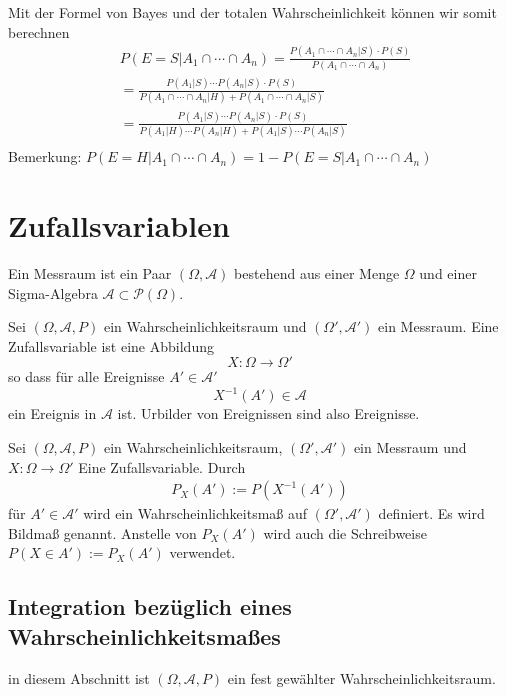 Mit der Formel von Bayes und der totalen Wahrscheinlichkeit  können wir somit berechnen
\begin{align*}
& P(E=S |  A_1 \cap \cdots \cap A_n) = \frac{P(A_1 \cap \cdots \cap A_n | S) \cdot P(S)}{P(A_1 \cap \cdots \cap A_n)} \\
&=  \frac{P(A_1 | S) \cdots P(A_n | S) \cdot P(S)}{P(A_1 \cap \cdots \cap A_n | H) + P(A_1 \cap \cdots \cap A_n | S)} \\
&=  \frac{P(A_1 | S) \cdots P(A_n | S) \cdot P(S)}{P(A_1 | H) \cdots P(A_n | H)  + P(A_1 | S) \cdots P(A_n | S) } \\
\end{align*}
Bemerkung: $P(E=H |  A_1 \cap \cdots \cap A_n) = 1- P(E=S |  A_1 \cap \cdots \cap A_n) $


\section{Zufallsvariablen}

\begin{Definition}
Ein Messraum ist ein Paar $(\Omega, \mathcal{A})$ bestehend aus einer Menge $\Omega$ und einer Sigma-Algebra $\mathcal{A} \subset \mathcal{P}(\Omega)$.
\end{Definition}



\begin{Definition}
Sei $(\Omega, \mathcal{A}, P)$ ein Wahrscheinlichkeitsraum und $(\Omega', \mathcal{A}')$ ein Messraum. Eine Zufallsvariable ist eine Abbildung
$$X : \Omega \to \Omega'$$ 
so dass für alle Ereignisse $A' \in  \mathcal{A}'$
$$ X^{-1} (A') \in \mathcal{A}$$
 ein Ereignis in $\mathcal{A}$ ist. Urbilder von Ereignissen sind also Ereignisse.
\end{Definition}

\begin{Definition}
Sei $(\Omega, \mathcal{A}, P)$ ein Wahrscheinlichkeitsraum, $(\Omega', \mathcal{A}')$ ein Messraum und  $X : \Omega \to \Omega'$  Eine Zufallsvariable. 
Durch 
\begin{align*}
P_X (A') := P(X^{-1} (A'))
\end{align*}
 für $A' \in \mathcal{A}'$ wird ein Wahrscheinlichkeitsmaß auf  $(\Omega', \mathcal{A}')$ definiert. Es wird Bildmaß genannt. Anstelle von $P_X (A')$ wird auch die Schreibweise $P (X \in A'):= P_X (A')$ verwendet.
\end{Definition}



\subsection{Integration bezüglich eines Wahrscheinlichkeitsmaßes}
in diesem Abschnitt ist  $(\Omega, \mathcal{A},P)$ ein fest gewählter Wahrscheinlichkeitsraum.

